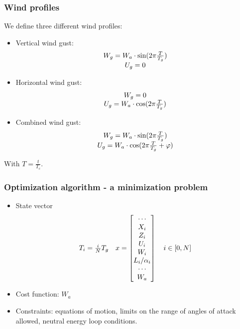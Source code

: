 \documentclass[compress]{beamer}
\begin{document}
\begin{frame}
  \frametitle{Wind profiles}
  We define three different wind profiles:
  \begin{itemize}
    \item Vertical wind gust:
      \begin{equation*}
	\begin{array}[c]{c}
	  W_g = W_a \cdot \sin(2\pi \frac{T}{T_g}) \\
	  U_g = 0 
	\end{array}
      \end{equation*}
    \item Horizontal wind gust:
      \begin{equation*}
	\begin{array}[c]{c}
	  W_g =0 \\ 
	  U_g = W_a \cdot \cos(2\pi \frac{T}{T_g}) 
	\end{array}
      \end{equation*}
    \item Combined wind gust:
      \begin{equation*}
	\begin{array}[c]{c}
	  W_g = W_a \cdot \sin(2\pi \frac{T}{T_g}) \\ 
	  U_g = W_a \cdot \cos(2 \pi \frac{T}{T_g} + \varphi)
	\end{array}
      \end{equation*}
  \end{itemize}
  With $T=\frac{t}{T_c}$.
\end{frame}

\begin{frame}
  \frametitle{Optimization algorithm - a minimization problem}
  \begin{itemize}
    \item State vector
      \begin{equation*}
	\begin{array}[c]{cc}
	  T_i=\frac{i}{N}T_g &
	  x= 
	  \begin{bmatrix}
	    \cdots \\
	    X_i \\
	    Z_i \\
	    U_i \\
	    W_i \\
	    L_i / \alpha_i \\
	    \cdots \\
	    W_a
	  \end{bmatrix}
	  \quad i \in [0,N]
	\end{array}
      \end{equation*}
    \item Cost function: $W_a$
    \item Constraints: equations of motion, limits on the range of angles of attack allowed, neutral energy loop conditions.
  \end{itemize}
\end{frame}
\end{document}
